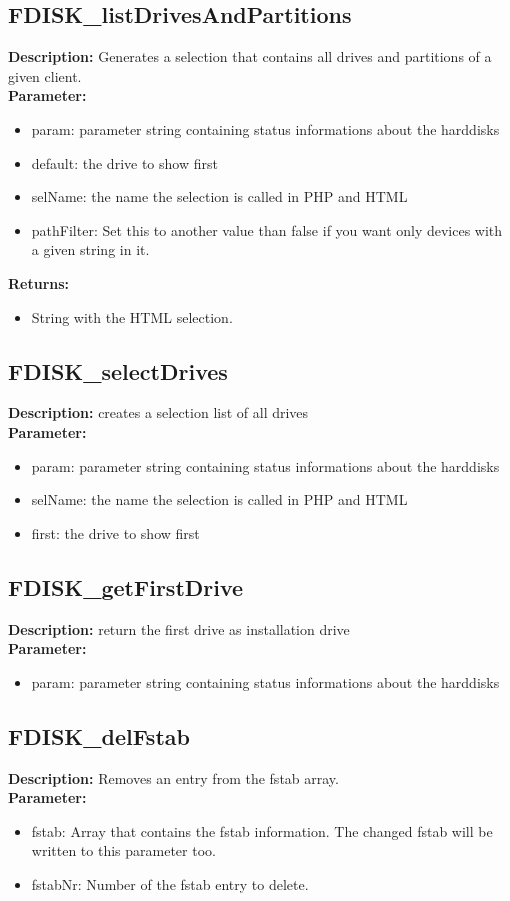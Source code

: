 \subsection{FDISK\_listDrivesAndPartitions}
\textbf{Description:} Generates a selection that contains all drives and partitions of a given client.\\
\textbf{Parameter:}
\begin{itemize}
\item param: parameter string containing status informations about the harddisks
\item default: the drive to show first
\item selName: the name the selection is called in PHP and HTML
\item pathFilter: Set this to another value than false if you want only devices with a given string in it.
\end{itemize}
\textbf{Returns:}
\begin{itemize}
\item String with the HTML selection.
\end{itemize}

\subsection{FDISK\_selectDrives}
\textbf{Description:} creates a selection list of all drives\\
\textbf{Parameter:}
\begin{itemize}
\item param: parameter string containing status informations about the harddisks
\item selName: the name the selection is called in PHP and HTML
\item first: the drive to show first
\end{itemize}

\subsection{FDISK\_getFirstDrive}
\textbf{Description:} return the first drive as installation drive\\
\textbf{Parameter:}
\begin{itemize}
\item param: parameter string containing status informations about the harddisks
\end{itemize}

\subsection{FDISK\_delFstab}
\textbf{Description:} Removes an entry from the fstab array.\\
\textbf{Parameter:}
\begin{itemize}
\item fstab: Array that contains the fstab information. The changed fstab will be written to this parameter too.
\item fstabNr: Number of the fstab entry to delete.
\end{itemize}

